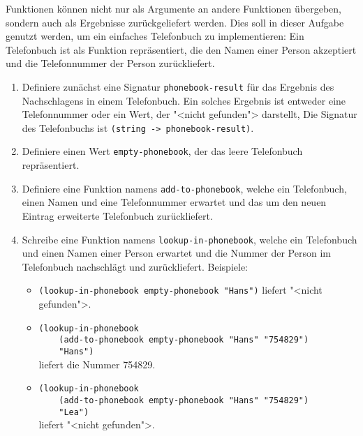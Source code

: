 \begin{aufgabe}
  Funktionen können nicht nur als Argumente an
  andere Funktionen übergeben, sondern auch als Ergebnisse
  zurückgeliefert werden. Dies soll in dieser Aufgabe genutzt werden,
  um ein einfaches Telefonbuch zu implementieren: Ein Telefonbuch ist
  als Funktion repräsentiert, die den Namen einer Person akzeptiert
  und die Telefonnummer der Person zurückliefert.

  \begin{enumerate}
  \item Definiere zunächst eine Signatur
    \lstinline{phonebook-result} für das Ergebnis des Nachschlagens in einem
    Telefonbuch. Ein solches Ergebnis ist entweder eine Telefonnummer
    oder ein Wert, der "<nicht gefunden"> darstellt,
    Die Signatur des Telefonbuchs ist  \lstinline{(string -> phonebook-result)}.
  \item Definiere einen Wert \lstinline{empty-phonebook}, der das leere
    Telefonbuch repräsentiert.
  \item Definiere eine Funktion namens
    \lstinline{add-to-phonebook}, welche ein Telefonbuch, einen Namen
    und eine Telefonnummer erwartet und das um den neuen Eintrag
    erweiterte
    Telefonbuch zurückliefert.
  \item Schreibe eine Funktion namens \lstinline{lookup-in-phonebook},
    welche ein Telefonbuch und einen Namen einer Person erwartet und die
    Nummer der Person im Telefonbuch nachschlägt und zurückliefert.
    Beispiele:
    \begin{itemize}
    \item \lstinline{(lookup-in-phonebook empty-phonebook "Hans")} liefert
      "<nicht gefunden">.
    \item \lstinline{(lookup-in-phonebook} \\
      \lstinline{    (add-to-phonebook empty-phonebook "Hans" "754829")}\\
      \lstinline{    "Hans")} \\
      liefert die Nummer 754829.
    \item \lstinline{(lookup-in-phonebook}\\
      \lstinline{    (add-to-phonebook empty-phonebook "Hans" "754829")}\\
      \lstinline{    "Lea")}\\
      liefert "<nicht gefunden">.
    \end{itemize}
  \end{enumerate}
\end{aufgabe}

